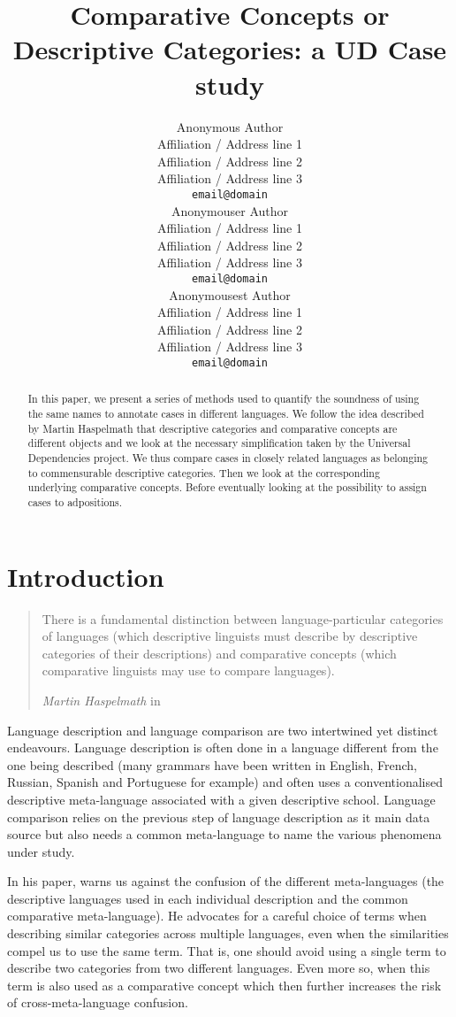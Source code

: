 \documentclass[11pt]{article}
\title{Comparative Concepts or Descriptive Categories: a UD Case study}
\author{Anonymous Author \\
 Affiliation / Address line 1 \\
 Affiliation / Address line 2 \\
 Affiliation / Address line 3 \\
 {\tt email@domain} \\\And
 Anonymouser Author \\
 Affiliation / Address line 1 \\
 Affiliation / Address line 2 \\
 Affiliation / Address line 3 \\
 {\tt email@domain} \\\And
 Anonymousest Author \\
 Affiliation / Address line 1 \\
 Affiliation / Address line 2 \\
 Affiliation / Address line 3 \\
 {\tt email@domain} \\}
\date{}
\begin{document}
\maketitle
\begin{abstract}
In this paper, we present a series of methods used to quantify the soundness of using the same names to annotate cases in different languages.
We follow the idea described by Martin Haspelmath that descriptive categories and comparative concepts are different objects and we look at the necessary simplification taken by the Universal Dependencies project.
We thus compare cases in closely related languages as belonging to commensurable descriptive categories.
Then we look at the corresponding underlying comparative concepts.
Before eventually looking at the possibility to assign cases to adpositions.
\end{abstract}

\section{Introduction}

\begin{quote}
    There is a fundamental distinction between language-particular categories of languages (which descriptive linguists must describe by descriptive categories of their descriptions) and comparative concepts (which comparative linguists may use to compare languages).
    {\begin{flushright}\textit{Martin Haspelmath} in \cite{Has18}\end{flushright}}
\end{quote}

Language description and language comparison are two intertwined yet distinct endeavours.
Language description is often done in a language different from the one being described (many grammars have been written in English, French, Russian, Spanish and Portuguese for example) and often uses a conventionalised descriptive meta-language associated with a given descriptive school.
Language comparison relies on the previous step of language description as it main data source but also needs a common meta-language to name the various phenomena under study.

In his paper,  warns us against the confusion of the different meta-languages (the descriptive languages used in each individual description and the common comparative meta-language).
He advocates for a careful choice of terms when describing similar categories across multiple languages, even when the similarities compel us to use the same term.
That is, one should avoid using a single term to describe two categories from two different languages.
Even more so, when this term is also used as a comparative concept which then further increases the risk of cross-meta-language confusion.
\end{document}
